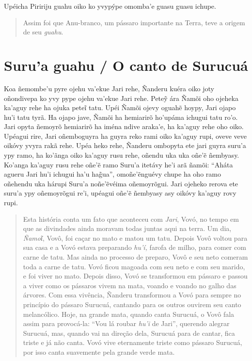 



Upéicha Piririju guahu oiko ko yvypýpe omomba'e guasu guasu ichupe.

\begin{quote}
Assim foi que Anu-branco, um pássaro importante na Terra, teve a origem
de seu \emph{guahu}.
\end{quote}

\chapter{Suru'a guahu / O canto de Surucuá}

Koa ñemombe'u pyre ojehu va'ekue Jari rehe, Ñanderu kuéra oiko joty
oñondivepa ko yvy pype ojehu va'ekue Jari rehe. Peteỹ ára Ñamõi oho
ojeheka ka'aguy rehe ha ojuka peteĩ tatu. Upéi Ñamõi ojevy oguahẽ hoypy,
Jari ojapo hu'i tatu tyrã. Ha ojapo jave, Ñamõi ha hemiarirõ ho'upáma
ichugui tatu ro'o. Jari opyta ñemoyrõ hemiarirõ ha iména ndive araka'e,
ha ka'aguy rehe oho oiko. Upéagui rire, Jari oñemboguyra ha guyra reko
rami oiko ka'aguy rupi, oveve veve oikóvy yvyra rakã rehe. Upéa heko
rehe, Ñanderu ombopyta ete jari guyra suru'a ypy ramo, ha ko'ãnga oiko
ka'aguy rusu rehe, oñendu uka uka oñe'ẽ ñembyasy. Ko'anga ka'aguy rusu
rehe oñe'ẽ ramo Suru'a itetávy he'i arã ñamõi: ``Aháta agueru Jari hu'i
ichugui ha'u hag̃ua'', omoñe'ẽnguévy chupe ha oho ramo oñehendu uka
hárupi Suru'a noñe'ẽvéima oñemoyrõgui. Jari ojeheko rerova ete suru'a
ypy oñemoyrõgui re'i, upéagui oñe'ẽ ñembyasy asy oikóvy ka'aguy rovy
rupi.

\begin{quote}
Esta história conta um fato que aconteceu com \emph{Jari}, Vovó, no
tempo em que as divindades ainda moravam todas juntas aqui na terra. Um
dia, \emph{Ñamoῖ}, Vovô, foi caçar no mato e matou um tatu. Depois Vovô
voltou para sua casa e a Vovó estava preparando \emph{hu'í,} farofa de
milho, para comer com carne de tatu. Mas ainda no processo de preparo,
Vovô e seu neto comeram toda a carne de tatu. Vovó ficou magoada com seu
neto e com seu marido, e foi viver no mato. Depois disso, Vovó se
transformou em pássaro e passou a viver como os pássaros vivem na mata,
voando e voando no galho das árvores. Com essa vivência, Ñanderu
transformou a Vovó para sempre no princípio do pássaro Surucuá, cantando
para os outros ouvirem seu canto melancólico. Hoje, na grande mata,
quando canta Surucuá, o Vovô fala assim para provocá-la: ``Vou lá roubar
\emph{hu'i} de Jari'', querendo alegrar Surucuá, mas, quando vai na
direção dela, Surucuá para de cantar, fica triste e já não canta. Vovó
vive eternamente triste como pássaro Surucuá, por isso canta suavemente
pela grande verde mata.
\end{quote}

